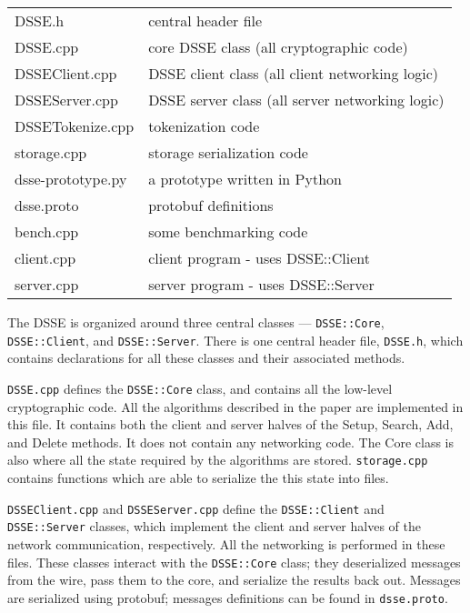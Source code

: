 \begin{center}
\begin{tabular}{ll}
    DSSE.h                      & central header file \\
    DSSE.cpp                    & core DSSE class (all cryptographic code) \\
    DSSEClient.cpp              & DSSE client class  (all client networking logic) \\
    DSSEServer.cpp              & DSSE server class  (all server networking logic) \\
    DSSETokenize.cpp            & tokenization code \\
    storage.cpp                 & storage serialization code \\
    \hline
    dsse-prototype.py           & a prototype written in Python \\
    dsse.proto                  & protobuf definitions \\
    \hline
    bench.cpp                   & some benchmarking code \\
    client.cpp                  & client program - uses DSSE::Client \\
    server.cpp                  & server program - uses DSSE::Server \\
\end{tabular}
\end{center}


The DSSE is organized around three central classes ---
\texttt{DSSE::Core}, \texttt{DSSE::Client}, and \texttt{DSSE::Server}.
There is one central header file, \texttt{DSSE.h},
which contains declarations for all these classes and their associated methods.


\texttt{DSSE.cpp} defines the \texttt{DSSE::Core} class, and
contains all the low-level cryptographic code.
All the algorithms described in the paper are implemented in this file.
It contains both the client and server halves of the Setup, Search, Add, and Delete methods.
It does not contain any networking code.
The Core class is also where all the state required by the algorithms are stored.
\texttt{storage.cpp} contains functions which are able to serialize the this state into files.

\texttt{DSSEClient.cpp} and \texttt{DSSEServer.cpp} define the
\texttt{DSSE::Client} and \texttt{DSSE::Server} classes,
which implement the client and server halves of the network communication, respectively.
All the networking is performed in these files.
These classes interact with the \texttt{DSSE::Core} class;
they deserialized messages from the wire, pass them to the core, and serialize the results back out.
Messages are serialized using protobuf; messages definitions can be found in \texttt{dsse.proto}.

